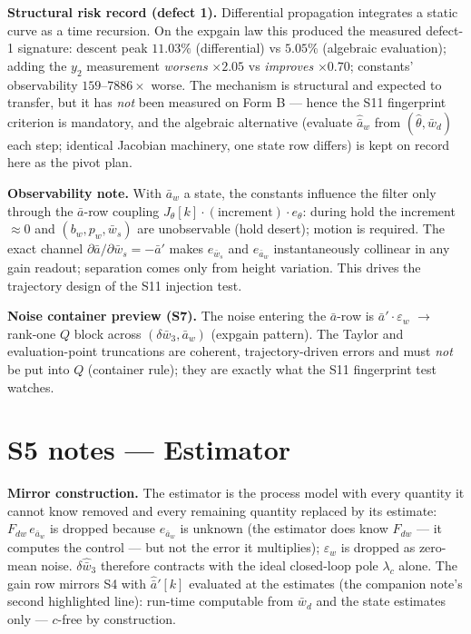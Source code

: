 \documentclass[11pt,a4paper,fontset=none]{ctexart}
\begin{document}
\textbf{Structural risk record (defect 1).}  Differential propagation
integrates a static curve as a time recursion.  On the expgain law this
produced the measured defect-1 signature: descent peak $11.03\%$
(differential) vs $5.05\%$ (algebraic evaluation); adding the $y_2$
measurement \emph{worsens} $\times 2.05$ vs \emph{improves} $\times 0.70$;
constants' observability $159$--$7886\times$ worse.  The mechanism is
structural and expected to transfer, but it has \emph{not} been measured on
Form B --- hence the S11 fingerprint criterion is mandatory, and the
algebraic alternative (evaluate $\hat{\bar{a}}_w$ from
$(\hat{\theta}, \bar{w}_d)$ each step; identical Jacobian machinery, one
state row differs) is kept on record here as the pivot plan.

\textbf{Observability note.}  With $\bar{a}_w$ a state, the constants
influence the filter only through the $\bar{a}$-row coupling
$J_\theta[k]\cdot(\text{increment})\cdot e_\theta$: during hold the
increment $\approx 0$ and $(b_w, p_w, \bar{w}_s)$ are unobservable (hold
desert); motion is required.  The exact channel
$\partial\bar{a}/\partial\bar{w}_s = -\bar{a}'$ makes $e_{\bar{w}_s}$ and
$e_{\bar{a}_w}$ instantaneously collinear in any gain readout; separation
comes only from height variation.  This drives the trajectory design of the
S11 injection test.

\textbf{Noise container preview (S7).}  The noise entering the
$\bar{a}$-row is $\bar{a}'\cdot\varepsilon_w$ $\to$ rank-one $Q$ block
across $(\delta\bar{w}_3, \bar{a}_w)$ (expgain pattern).  The Taylor and
evaluation-point truncations are coherent, trajectory-driven errors and
must \emph{not} be put into $Q$ (container rule); they are exactly what the
S11 fingerprint test watches.

\section*{S5 notes --- Estimator}

\textbf{Mirror construction.}  The estimator is the process model with every
quantity it cannot know removed and every remaining quantity replaced by its
estimate: $F_{dw}\,e_{\bar{a}_w}$ is dropped because $e_{\bar{a}_w}$ is
unknown (the estimator does know $F_{dw}$ --- it computes the control ---
but not the error it multiplies); $\varepsilon_w$ is dropped as zero-mean
noise.  $\delta\hat{\bar{w}}_3$ therefore contracts with the ideal
closed-loop pole $\lambda_c$ alone.  The gain row mirrors S4 with
$\hat{\bar{a}}'[k]$ evaluated at the estimates (the companion note's second
highlighted line): run-time computable from $\bar{w}_d$ and the state
estimates only --- $c$-free by construction.
\end{document}
